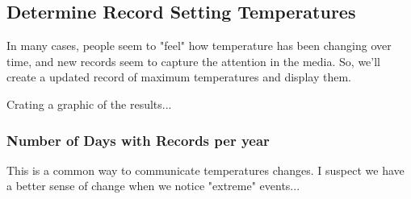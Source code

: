 \documentclass{article}\usepackage[]{graphicx}\usepackage[]{color}
\begin{document}
\subsection{Determine Record Setting Temperatures}

In many cases, people seem to "feel" how temperature has been changing over time, and new records seem to capture the attention in the media. So, we'll create a updated record of maximum temperatures and display them. 



Crating a graphic of the results...


\subsubsection{Number of Days with Records per year}

This is a common way to communicate temperatures changes. I suspect we have a better sense of change when we notice "extreme" events...
\end{document}
